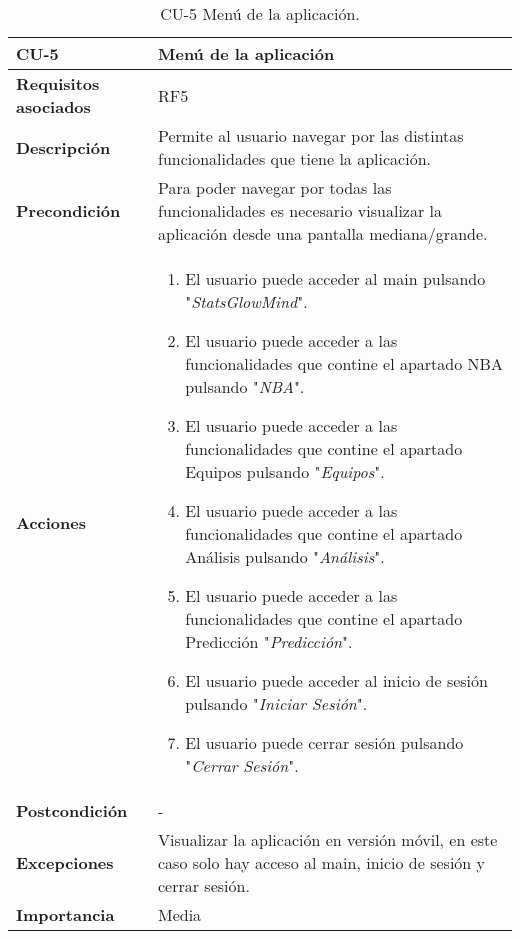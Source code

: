 \begin{table}[p]
	\centering
	\begin{tabularx}{\linewidth}{ p{} p{} }
		\toprule
		\textbf{CU-5}    & \textbf{Menú de la aplicación}\\
		\toprule
		\textbf{Requisitos asociados} & RF5 \\
		\textbf{Descripción}          & Permite al usuario navegar por las distintas funcionalidades que tiene la aplicación. \\
		\textbf{Precondición}         & Para poder navegar por todas las funcionalidades es necesario visualizar la aplicación desde una pantalla mediana/grande. \\
		\textbf{Acciones}             &
		\begin{enumerate}
			\def\labelenumi{\arabic{enumi}.}
			\tightlist
			\item El usuario puede acceder al main pulsando "\textit{StatsGlowMind}".
			\item El usuario puede acceder a las funcionalidades que contine el apartado NBA pulsando "\textit{NBA}".
            \item El usuario puede acceder a las funcionalidades que contine el apartado Equipos pulsando "\textit{Equipos}".
            \item El usuario puede acceder a las funcionalidades que contine el apartado Análisis pulsando "\textit{Análisis}".
            \item El usuario puede acceder a las funcionalidades que contine el apartado Predicción "\textit{Predicción}".
            \item El usuario puede acceder al inicio de sesión pulsando "\textit{Iniciar Sesión}".
            \item El usuario puede cerrar sesión pulsando "\textit{Cerrar Sesión}".
		\end{enumerate}\\
		\textbf{Postcondición}        &  - \\
		\textbf{Excepciones}          &  Visualizar la aplicación en versión móvil, en este caso solo hay acceso al main, inicio de sesión y cerrar sesión. \\
		\textbf{Importancia}          & Media \\
		\bottomrule
	\end{tabularx}
	\caption{CU-5 Menú de la aplicación.}
\end{table}

